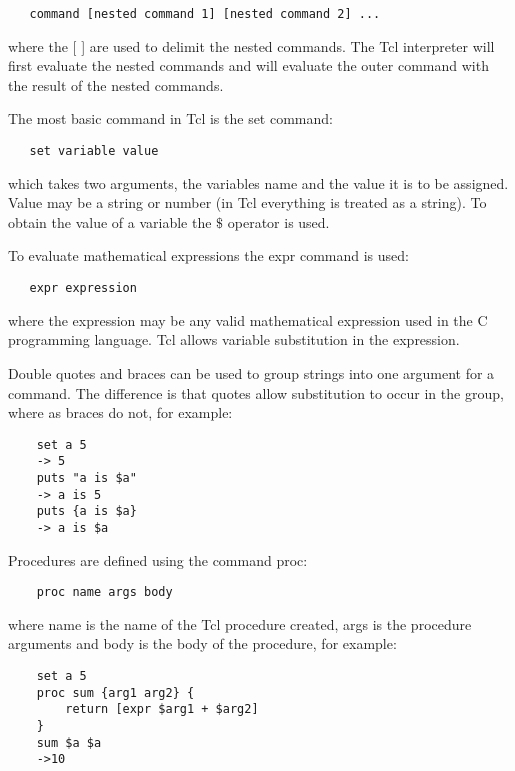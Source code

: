 \documentclass[12pt]{article}
\begin{document}
{\sf\small
\begin{verbatim}
   command [nested command 1] [nested command 2] ...
\end{verbatim}
}

\noindent where the [ ] are used to delimit the nested commands. The Tcl
interpreter will first evaluate the nested commands and will evaluate
the outer command with the result of the nested commands.

The most basic command in Tcl is the set command:

{\sf\small
\begin{verbatim}
   set variable value
\end{verbatim}
}

\noindent which takes two arguments, the variables name and the value it is to
be assigned. Value may be a string or number (in Tcl everything is
treated as a string). To obtain the value of a variable the $\$$
operator is used. 

To evaluate mathematical expressions the expr command is used:

{\sf\small
\begin{verbatim}
   expr expression
\end{verbatim}
}

\noindent where the expression may be any valid mathematical
expression used in the C programming language. Tcl allows variable
substitution in the expression.

Double quotes and braces can be used to group strings into one
argument for a command. The difference is that quotes allow
substitution to occur in the group, where as braces do not, for example:

{\sf\small
\begin{verbatim}
	set a 5
	-> 5
	puts "a is $a"
	-> a is 5
	puts {a is $a}
	-> a is $a
\end{verbatim}
}

Procedures are defined using the command proc:

{\sf\small
\begin{verbatim}
	proc name args body
\end{verbatim}
}

\noindent where name is the name of the Tcl procedure created, args is the
procedure arguments and body is the body of the procedure, for example:

{\sf\small
\begin{verbatim}
	set a 5
	proc sum {arg1 arg2} {
		return [expr $arg1 + $arg2]
	}
	sum $a $a
	->10
\end{verbatim}
}
\end{document}
